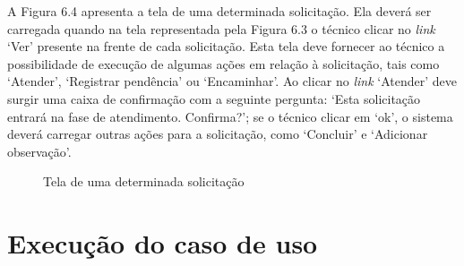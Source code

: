 A Figura 6.4 apresenta a tela de uma determinada solicitação. Ela deverá ser carregada quando na tela representada pela Figura 6.3 o técnico clicar no \textit{link} ‘Ver’ presente na frente de cada solicitação. Esta tela deve fornecer ao técnico a possibilidade de execução de algumas ações em relação à solicitação, tais como ‘Atender’, ‘Registrar pendência’ ou ‘Encaminhar’. Ao clicar no \textit{link} ‘Atender’ deve surgir uma caixa de confirmação com a seguinte pergunta: ‘Esta solicitação entrará na fase de atendimento. Confirma?’; se o técnico clicar em ‘ok’, o sistema deverá carregar outras ações para a solicitação, como ‘Concluir’ e ‘Adicionar observação’.

\newpage

\begin{figure}[ht]
    \centering
    \caption{Tela de uma determinada solicitação}
\end{figure}

\section{Execução do caso de uso}

